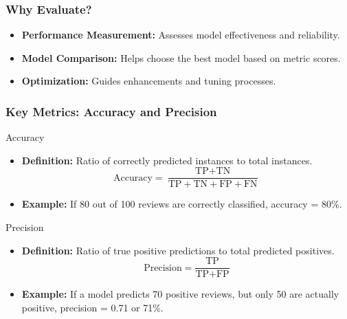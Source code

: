 \documentclass[aspectratio=169]{beamer}
\begin{document}
\begin{frame}[fragile]
    \frametitle{Why Evaluate?}
    \begin{itemize}
        \item \textbf{Performance Measurement:} Assesses model effectiveness and reliability.
        \item \textbf{Model Comparison:} Helps choose the best model based on metric scores.
        \item \textbf{Optimization:} Guides enhancements and tuning processes.
    \end{itemize}
\end{frame}

\begin{frame}[fragile]
    \frametitle{Key Metrics: Accuracy and Precision}
    \begin{block}{Accuracy}
        \begin{itemize}
            \item \textbf{Definition:} Ratio of correctly predicted instances to total instances.
            \begin{equation}
                \text{Accuracy} = \frac{\text{TP} + \text{TN}}{\text{TP} + \text{TN} + \text{FP} + \text{FN}}
            \end{equation}
            \item \textbf{Example:} If 80 out of 100 reviews are correctly classified, accuracy = 80\%.
        \end{itemize}
    \end{block}

    \begin{block}{Precision}
        \begin{itemize}
            \item \textbf{Definition:} Ratio of true positive predictions to total predicted positives.
            \begin{equation}
                \text{Precision} = \frac{\text{TP}}{\text{TP} + \text{FP}}
            \end{equation}
            \item \textbf{Example:} If a model predicts 70 positive reviews, but only 50 are actually positive, precision = 0.71 or 71\%.
        \end{itemize}
    \end{block}
\end{frame}
\end{document}
